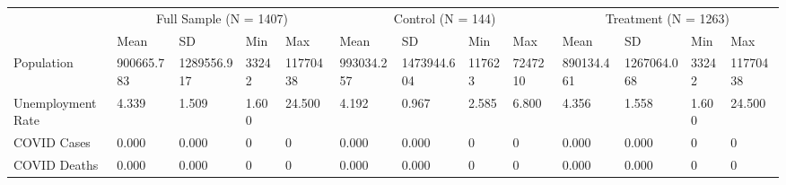 \begin{tabular}{lllllllllllll}
\toprule
 & \multicolumn{4}{c}{Full Sample (N = 1407)} & \multicolumn{4}{c}{Control (N = 144)} & \multicolumn{4}{c}{Treatment (N = 1263)} \\
 & Mean & SD & Min & Max & Mean & SD & Min & Max & Mean & SD & Min & Max \\
\midrule
Population & 900665.783 & 1289556.917 & 33242 & 11770438 & 993034.257 & 1473944.604 & 117623 & 7247210 & 890134.461 & 1267064.068 & 33242 & 11770438 \\
Unemployment Rate & 4.339 & 1.509 & 1.600 & 24.500 & 4.192 & 0.967 & 2.585 & 6.800 & 4.356 & 1.558 & 1.600 & 24.500 \\
COVID Cases & 0.000 & 0.000 & 0 & 0 & 0.000 & 0.000 & 0 & 0 & 0.000 & 0.000 & 0 & 0 \\
COVID Deaths & 0.000 & 0.000 & 0 & 0 & 0.000 & 0.000 & 0 & 0 & 0.000 & 0.000 & 0 & 0 \\
\bottomrule
\end{tabular}
